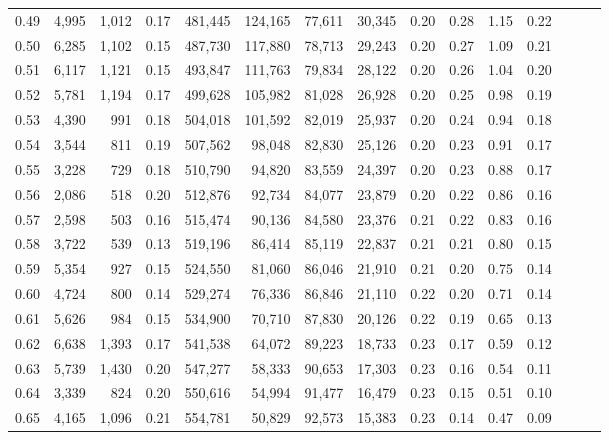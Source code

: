 \begin{tabular}{rrrrrrrrrrrrrrr}
0.49 &   4,995 &  1,012 &  0.17 &  481,445 &  124,165 &   77,611 &   30,345 &  0.20 &  0.28 &  1.15 &      0.22 \\
0.50 &   6,285 &  1,102 &  0.15 &  487,730 &  117,880 &   78,713 &   29,243 &  0.20 &  0.27 &  1.09 &      0.21 \\
0.51 &   6,117 &  1,121 &  0.15 &  493,847 &  111,763 &   79,834 &   28,122 &  0.20 &  0.26 &  1.04 &      0.20 \\
0.52 &   5,781 &  1,194 &  0.17 &  499,628 &  105,982 &   81,028 &   26,928 &  0.20 &  0.25 &  0.98 &      0.19 \\
0.53 &   4,390 &    991 &  0.18 &  504,018 &  101,592 &   82,019 &   25,937 &  0.20 &  0.24 &  0.94 &      0.18 \\
0.54 &   3,544 &    811 &  0.19 &  507,562 &   98,048 &   82,830 &   25,126 &  0.20 &  0.23 &  0.91 &      0.17 \\
0.55 &   3,228 &    729 &  0.18 &  510,790 &   94,820 &   83,559 &   24,397 &  0.20 &  0.23 &  0.88 &      0.17 \\
0.56 &   2,086 &    518 &  0.20 &  512,876 &   92,734 &   84,077 &   23,879 &  0.20 &  0.22 &  0.86 &      0.16 \\
0.57 &   2,598 &    503 &  0.16 &  515,474 &   90,136 &   84,580 &   23,376 &  0.21 &  0.22 &  0.83 &      0.16 \\
0.58 &   3,722 &    539 &  0.13 &  519,196 &   86,414 &   85,119 &   22,837 &  0.21 &  0.21 &  0.80 &      0.15 \\
0.59 &   5,354 &    927 &  0.15 &  524,550 &   81,060 &   86,046 &   21,910 &  0.21 &  0.20 &  0.75 &      0.14 \\
0.60 &   4,724 &    800 &  0.14 &  529,274 &   76,336 &   86,846 &   21,110 &  0.22 &  0.20 &  0.71 &      0.14 \\
0.61 &   5,626 &    984 &  0.15 &  534,900 &   70,710 &   87,830 &   20,126 &  0.22 &  0.19 &  0.65 &      0.13 \\
0.62 &   6,638 &  1,393 &  0.17 &  541,538 &   64,072 &   89,223 &   18,733 &  0.23 &  0.17 &  0.59 &      0.12 \\
0.63 &   5,739 &  1,430 &  0.20 &  547,277 &   58,333 &   90,653 &   17,303 &  0.23 &  0.16 &  0.54 &      0.11 \\
0.64 &   3,339 &    824 &  0.20 &  550,616 &   54,994 &   91,477 &   16,479 &  0.23 &  0.15 &  0.51 &      0.10 \\
0.65 &   4,165 &  1,096 &  0.21 &  554,781 &   50,829 &   92,573 &   15,383 &  0.23 &  0.14 &  0.47 &      0.09 \\

\end{tabular}
